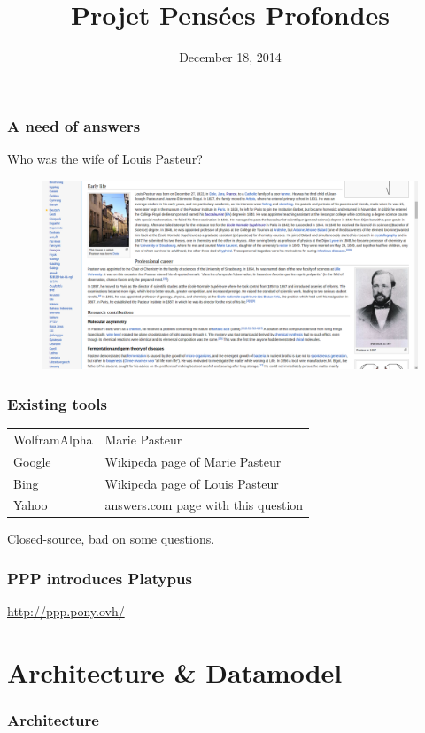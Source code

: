 \documentclass[10pt, compress]{beamer}
\title{Projet Pensées Profondes}
\subtitle{}
\date{December 18, 2014}
\institute{École Normale Supérieure de Lyon}
\begin{document}
\maketitle

\begin{frame}[fragile]
    \frametitle{A need of answers}
    Who was the wife of Louis Pasteur?
    \begin{figure}
        \includegraphics[width=\textwidth]{pasteurWiki.png}
    \end{figure}
\end{frame}

\begin{frame}[fragile]
    \frametitle{Existing tools}
    \begin{tabular}{ll}
        WolframAlpha & Marie Pasteur\\
        Google & Wikipeda page of Marie Pasteur\\
        Bing & Wikipeda page of Louis Pasteur\\
        Yahoo & answers.com page with this question
    \end{tabular}
\medbreak
\alert{Closed-source, bad on some questions.}
\end{frame}

\begin{frame}[fragile]
    \frametitle{PPP introduces Platypus}
    \begin{center}
        \url{http://ppp.pony.ovh/}
    \end{center}
\end{frame}

\section{Architecture \& Datamodel}
\begin{frame}[fragile]
    \frametitle{Architecture}
    \begin{figure}
        \resizebox{.9\linewidth}{!}{
            
        }
    \end{figure}
\end{frame}
\end{document}
